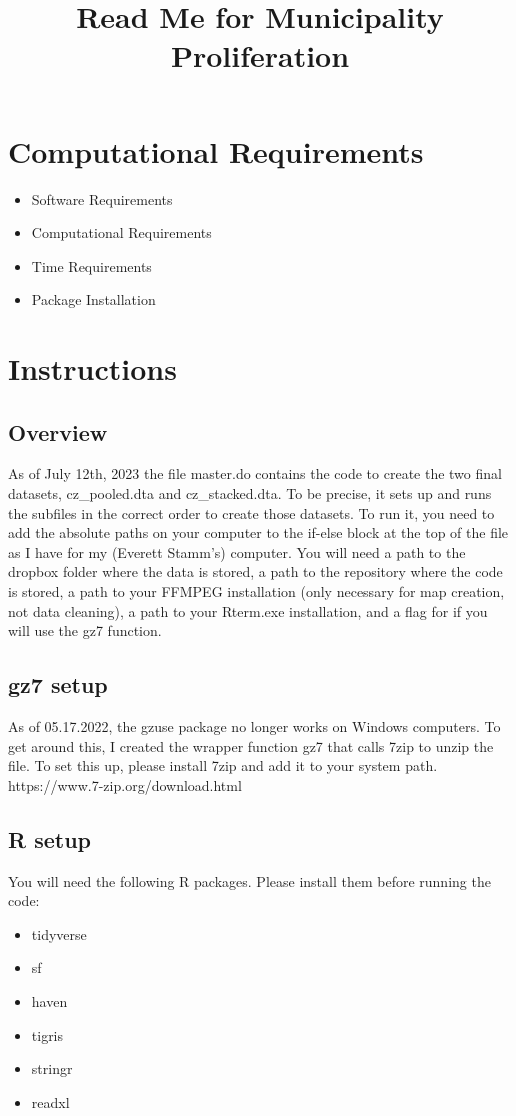 \documentclass{article}
\title{Read Me for Municipality Proliferation}
\begin{document}
\section{Computational Requirements}
\begin{itemize}
\item Software Requirements
\item Computational Requirements
\item Time Requirements
\item Package Installation
\end{itemize}

\section{Instructions}
\subsection{Overview}
As of July 12th, 2023 the file master.do contains the code to create the two final datasets, cz\_pooled.dta and cz\_stacked.dta. To be precise, it sets up and runs the subfiles in the correct order to create those datasets. To run it, you need to add the absolute paths on your computer to the if-else block at the top of the file as I have for my (Everett Stamm's) computer. You will need a path to the dropbox folder where the data is stored, a path to the repository where the code is stored, a path to your FFMPEG installation (only necessary for map creation, not data cleaning), a path to your Rterm.exe installation, and a flag for if you will use the gz7 function. 

\subsection{gz7 setup}
As of 05.17.2022, the gzuse package no longer works on Windows computers. To get around this, I created the wrapper function gz7 that calls 7zip to unzip the file. To set this up, please install 7zip and add it to your system path. https://www.7-zip.org/download.html

\subsection{R setup}
You will need the following R packages. Please install them before running the code:
\begin{itemize}
\item tidyverse
\item sf
\item haven
\item tigris
\item stringr
\item readxl
\end{itemize}
\end{document}
